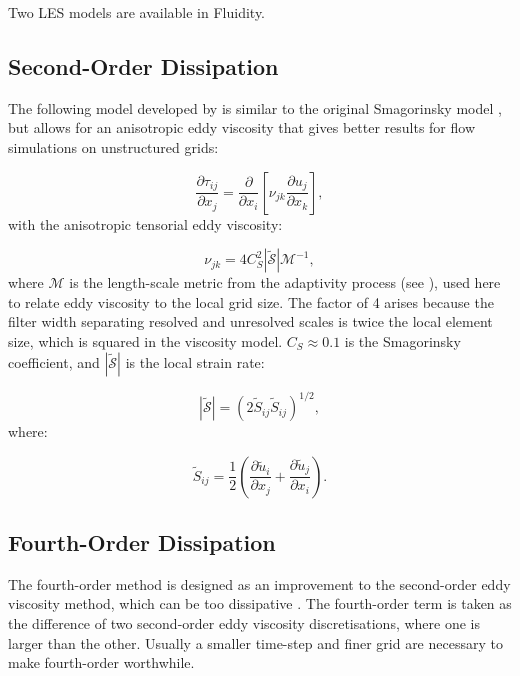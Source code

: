Two LES models are available in Fluidity.

\subsection{Second-Order Dissipation}

The following model developed by \citet{bentham2003} is similar to the original Smagorinsky model \citep{smagorinsky1963general}, but allows for an anisotropic eddy viscosity that gives better results for flow simulations on unstructured grids:

\begin{equation}
\frac{\partial \tau_{ij}}{\partial x_j} = \frac{\partial}{\partial x_i} \left [ \nu_{jk}\frac{\partial u_j}{\partial x_k} \right ],
\end{equation}
with the anisotropic tensorial eddy viscosity:

\begin{equation}
\nu_{jk} = 4C_S^2 \left | \mathcal{\tilde S} \right | \mathcal{M}^{-1},
\end{equation}
where $\mathcal{M}$ is the length-scale metric from the adaptivity process (see \citet{pain2001}), used here to relate eddy viscosity to the local grid size. The factor of 4 arises because the filter width separating resolved and unresolved scales is twice the local element size, which is squared in the viscosity model. $C_S \approx 0.1$ is the Smagorinsky coefficient, and $\left | \mathcal{\tilde S} \right |$ is the local strain rate:

\begin{equation}
\left | \mathcal{\tilde S} \right | = (2 \tilde S_{ij} \tilde S_{ij})^{1/2},
\end{equation}
where:

\begin{equation}
\tilde S_{ij} = \frac 1 2 \left ( \frac{\partial \tilde u_i}{\partial x_j} + \frac{\partial \tilde u_j}{\partial x_i} \right ).
\end{equation}

\subsection{Fourth-Order Dissipation}

The fourth-order method is designed as an improvement to the second-order eddy viscosity method, which can be too dissipative \citep{adam}. The fourth-order term is taken as the difference of two second-order eddy viscosity discretisations, where one is larger than the other. Usually a smaller time-step and finer grid are necessary to make fourth-order worthwhile.
